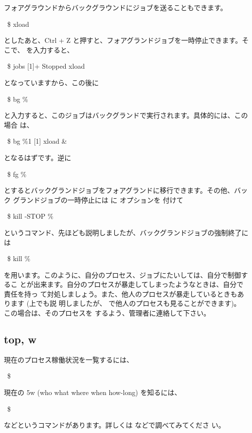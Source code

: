 \documentclass[platex]{jsarticle}
\begin{document}
  フォアグラウンドからバックグラウンドにジョブを送ることもできます。
  \begin{terminal}~\$ xload\end{terminal}
  としたあと、Ctrl + Z と押すと、フォアグランドジョブを一時停止できます。そこで、
   を入力すると、
  \begin{terminal}%
~\$ jobs
[1]+  Stopped                 xload\end{terminal}
  となっていますから、この後に
  \begin{terminal}~\$ bg \%\end{terminal}
  と入力すると、このジョブはバックグランドで実行されます。具体的には、この場合
  は、
  \begin{terminal}%
~\$ bg \%1
[1] xload &\end{terminal}
  となるはずです。逆に
  \begin{terminal}~\$ fg \%\end{terminal}
  とするとバックグランドジョブをフォアグランドに移行できます。その他、バック
  グランドジョブの一時停止には  に  オプションを
  付けて
  \begin{terminal}~\$ kill -STOP \%\end{terminal}
  というコマンド、先ほども説明しましたが、バックグランドジョブの強制終了には
  \begin{terminal}~\$ kill \%\end{terminal}
  を用います。このように、自分のプロセス、ジョブにたいしては、自分で制御するこ
  とが出来ます。自分のプロセスが暴走してしまったようなときは、自分で責任を持っ
  て対処しましょう。また、他人のプロセスが暴走しているときもあります (上でも説
  明しましたが、 で他人のプロセスも見ることができます)。
  この場合は、そのプロセスを  するよう、管理者に連絡して下さい。


  \subsection{top, w}
  現在のプロセス稼働状況を一覧するには、
  \begin{terminal}~\$ \end{terminal}
  現在の 5w (who what where when how-long) を知るには、
  \begin{terminal}~\$ \end{terminal}
  などというコマンドがあります。詳しくは  などで調べてみてくださ
  い。
\end{document}
